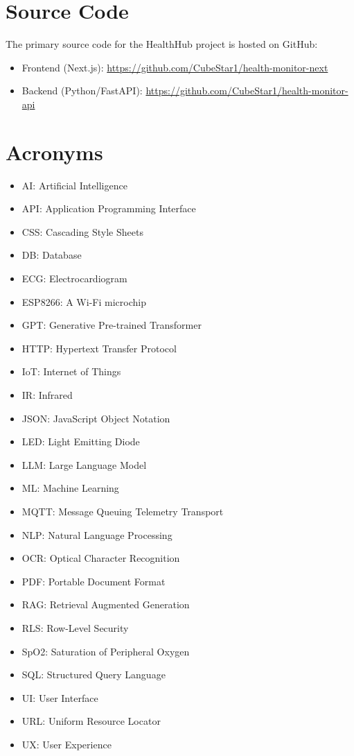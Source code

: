 
\section{Source Code}

The primary source code for the HealthHub project is hosted on GitHub:
\begin{itemize}
    \item Frontend (Next.js): \url{https://github.com/CubeStar1/health-monitor-next}
    \item Backend (Python/FastAPI): \url{https://github.com/CubeStar1/health-monitor-api}
\end{itemize}

\section{Acronyms}
\begin{itemize}
    \item AI: Artificial Intelligence
    \item API: Application Programming Interface
    \item CSS: Cascading Style Sheets
    \item DB: Database
    \item ECG: Electrocardiogram
    \item ESP8266: A Wi-Fi microchip
    \item GPT: Generative Pre-trained Transformer
    \item HTTP: Hypertext Transfer Protocol
    \item IoT: Internet of Things
    \item IR: Infrared
    \item JSON: JavaScript Object Notation
    \item LED: Light Emitting Diode
    \item LLM: Large Language Model
    \item ML: Machine Learning
    \item MQTT: Message Queuing Telemetry Transport
    \item NLP: Natural Language Processing
    \item OCR: Optical Character Recognition
    \item PDF: Portable Document Format
    \item RAG: Retrieval Augmented Generation
    \item RLS: Row-Level Security
    \item SpO2: Saturation of Peripheral Oxygen
    \item SQL: Structured Query Language
    \item UI: User Interface
    \item URL: Uniform Resource Locator
    \item UX: User Experience
\end{itemize}
